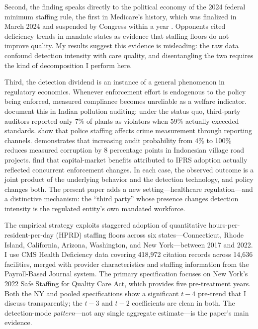\documentclass[12pt]{article}
\begin{document}
Second, the finding speaks directly to the political economy of the 2024 federal minimum staffing rule, the first in Medicare's history, which was finalized in March 2024 and suspended by Congress within a year \citep{cms2024rule, cms2025repeal}. Opponents cited deficiency trends in mandate states as evidence that staffing floors do not improve quality. My results suggest this evidence is misleading: the raw data confound detection intensity with care quality, and disentangling the two requires the kind of decomposition I perform here.

Third, the detection dividend is an instance of a general phenomenon in regulatory economics. Whenever enforcement effort is endogenous to the policy being enforced, measured compliance becomes unreliable as a welfare indicator. \citet{duflo2013} document this in Indian pollution auditing: under the status quo, third-party auditors reported only 7\% of plants as violators when 59\% actually exceeded standards. \citet{chalfin2018} show that police staffing affects crime measurement through reporting channels. \citet{olken2007} demonstrates that increasing audit probability from 4\% to 100\% reduces measured corruption by 8 percentage points in Indonesian village road projects. \citet{christensen2013} find that capital-market benefits attributed to IFRS adoption actually reflected concurrent enforcement changes. In each case, the observed outcome is a joint product of the underlying behavior and the detection technology, and policy changes both. The present paper adds a new setting---healthcare regulation---and a distinctive mechanism: the ``third party'' whose presence changes detection intensity is the regulated entity's own mandated workforce.

The empirical strategy exploits staggered adoption of quantitative hours-per-resident-per-day (HPRD) staffing floors across six states---Connecticut, Rhode Island, California, Arizona, Washington, and New York---between 2017 and 2022. I use CMS Health Deficiency data covering 418,972 citation records across 14,636 facilities, merged with provider characteristics and staffing information from the Payroll-Based Journal system. The primary specification focuses on New York's 2022 Safe Staffing for Quality Care Act, which provides five pre-treatment years. Both the NY and pooled specifications show a significant $t-4$ pre-trend that I discuss transparently; the $t-3$ and $t-2$ coefficients are clean in both. The detection-mode \textit{pattern}---not any single aggregate estimate---is the paper's main evidence.
\end{document}
